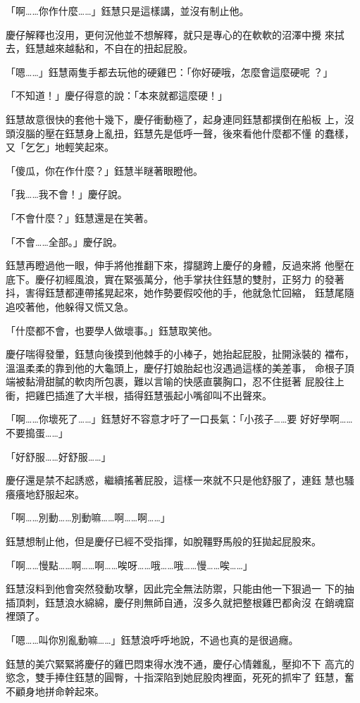 「啊……你作什麼……」鈺慧只是這樣講，並沒有制止他。

慶仔解釋也沒用，更何況他並不想解釋，就只是專心的在軟軟的沼澤中攪
來拭去，鈺慧越來越黏和，不自在的扭起屁股。

「嗯……」鈺慧兩隻手都去玩他的硬雞巴：「你好硬哦，怎麼會這麼硬呢
？」

「不知道！」慶仔得意的說：「本來就都這麼硬！」

鈺慧故意很快的套他十幾下，慶仔衝動極了，起身連同鈺慧都撲倒在船板
上，沒頭沒腦的壓在鈺慧身上亂扭，鈺慧先是低呼一聲，後來看他什麼都不懂
的蠢樣，又「乞乞」地輕笑起來。

「傻瓜，你在作什麼？」鈺慧半瞇著眼瞪他。

「我……我不會！」慶仔說。

「不會什麼？」鈺慧還是在笑著。

「不會……全部。」慶仔說。

鈺慧再瞪過他一眼，伸手將他推翻下來，撐腿跨上慶仔的身體，反過來將
他壓在底下。慶仔初經風浪，實在緊張萬分，他手掌扶住鈺慧的雙肘，正努力
的發著抖，害得鈺慧都連帶搖晃起來，她作勢要假咬他的手，他就急忙回縮，
鈺慧尾隨追咬著他，他躲得又慌又急。

「什麼都不會，也要學人做壞事。」鈺慧取笑他。

慶仔喘得發暈，鈺慧向後摸到他棘手的小棒子，她抬起屁股，扯開泳裝的
襠布，溫溫柔柔的靠到他的大龜頭上，慶仔打娘胎起也沒遇過這樣的美差事，
命根子頂端被黏滑甜膩的軟肉所包裹，難以言喻的快感直襲胸口，忍不住挺著
屁股往上衝，把雞巴插進了大半根，插得鈺慧張起小嘴卻叫不出聲來。

「啊……你壞死了……」鈺慧好不容意才吁了一口長氣：「小孩子……要
好好學啊……不要搗蛋……」

「好舒服……好舒服……」

慶仔還是禁不起誘惑，繼續搖著屁股，這樣一來就不只是他舒服了，連鈺
慧也騷癢癢地舒服起來。

「啊……別動……別動嘛……啊……啊……」

鈺慧想制止他，但是慶仔已經不受指揮，如脫韁野馬般的狂拋起屁股來。

「啊……慢點……啊……啊……唉呀……哦……哦……慢……唉……」

鈺慧沒料到他會突然發動攻擊，因此完全無法防禦，只能由他一下狠過一
下的抽插頂刺，鈺慧浪水綿綿，慶仔則無師自通，沒多久就把整根雞巴都肏沒
在銷魂窟裡頭了。

「嗯……叫你別亂動嘛……」鈺慧浪呼呼地說，不過也真的是很過癮。

鈺慧的美穴緊緊將慶仔的雞巴悶束得水洩不通，慶仔心情雜亂，壓抑不下
高亢的慾念，雙手捧住鈺慧的圓臀，十指深陷到她屁股肉裡面，死死的抓牢了
鈺慧，奮不顧身地拼命幹起來。

